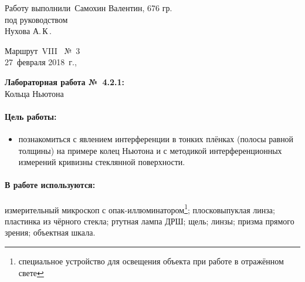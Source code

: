 \documentclass[12pt]{article}
\begin{document}
	\begin{minipage}{0.45\linewidth}
	Работу выполнили\
	Самохин Валентин, 676 гр.\\[2mm]
	под руководством\\
	Нухова А.\,К\,.
	\end{minipage}
	\hfill
	\begin{minipage}{0.45\linewidth}\flushright
		Маршрут~VIII \ №~3\\[3mm]
		27~февраля 2018~г.,\\
		\end{minipage}
		
		\vspace{8mm}
		\begin{center}
			\textbf{\Large Лабораторная работа №~4.2.1:}\\[\parskip]
			\LARGE Кольца Ньютона
			\end{center}
			\vspace{0mm}
			\paragraph{Цель работы:}
			\begin{itemize}
				\item познакомиться с явлением интерференции в тонких
				плёнках (полосы равной толщины) на примере колец Ньютона и с
				методикой интерференционных измерений кривизны стеклянной поверхности.
			\end{itemize}
			
			\paragraph{В работе используются:}
			измерительный микроскоп с опак-иллюминатором\footnote{специальное устройство
				для освещения объекта при работе в отражённом свете}; плосковыпуклая линза; пластинка из чёрного стекла;
			ртутная лампа ДРШ; щель; линзы; призма прямого зрения; объектная шкала.
			
			
			\vspace{2\parskip}
\end{document}
